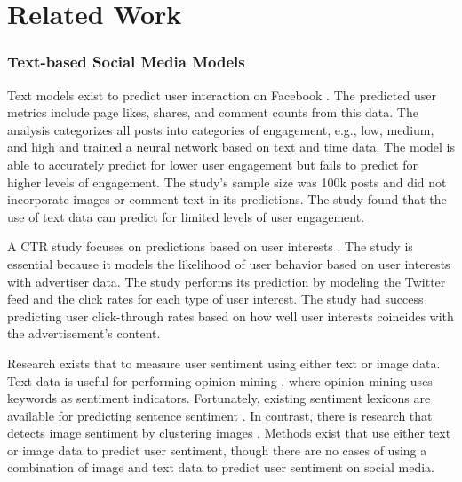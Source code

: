 \documentclass{article}
\begin{document}
\section{Related Work}


\subsubsection{Text-based Social Media Models}
Text models exist to predict user interaction on Facebook \cite{8029313}. The predicted user metrics include page likes, shares, and comment counts from this data. The analysis categorizes all posts into categories of engagement, e.g., low, medium, and high and trained a neural network based on text and time data. The model is able to accurately predict for lower user engagement but fails to predict for higher levels of engagement. The study's sample size was 100k posts and did not incorporate images or comment text in its predictions. The study found that the use of text data can predict for limited levels of user engagement.

A CTR study focuses on predictions based on user interests \cite{Li2015}. The study is essential because it models the likelihood of user behavior based on user interests with advertiser data.  The study performs its prediction by modeling the Twitter feed and the click rates for each type of user interest. The study had success predicting user click-through rates based on how well user interests coincides with the advertisement's content.

Research exists that to measure user sentiment using either text or image data. Text data is useful for performing opinion mining \cite{Liu2012}, where opinion mining uses keywords as sentiment indicators. Fortunately, existing sentiment lexicons are available for predicting sentence sentiment \cite{Georgiou2015}. In contrast, there is research that detects image sentiment by clustering images \cite{Wang2015}. Methods exist that use either text or image data to predict user sentiment, though there are no cases of using a combination of image and text data to predict user sentiment on social media.
\end{document}
